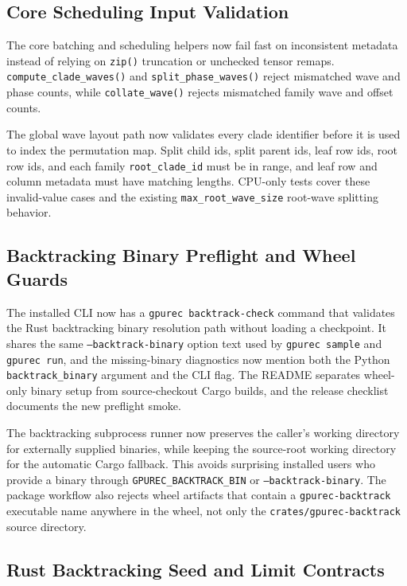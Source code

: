 \documentclass[11pt]{article}
\begin{document}
\subsection{Core Scheduling Input Validation}

The core batching and scheduling helpers now fail fast on inconsistent
metadata instead of relying on \texttt{zip()} truncation or unchecked tensor
remaps.  \texttt{compute\_clade\_waves()} and
\texttt{split\_phase\_waves()} reject mismatched wave and phase counts, while
\texttt{collate\_wave()} rejects mismatched family wave and offset counts.

The global wave layout path now validates every clade identifier before it is
used to index the permutation map.  Split child ids, split parent ids, leaf row
ids, root row ids, and each family \texttt{root\_clade\_id} must be in range,
and leaf row and column metadata must have matching lengths.  CPU-only tests
cover these invalid-value cases and the existing \texttt{max\_root\_wave\_size}
root-wave splitting behavior.

\subsection{Backtracking Binary Preflight and Wheel Guards}

The installed CLI now has a \texttt{gpurec backtrack-check} command that
validates the Rust backtracking binary resolution path without loading a
checkpoint.  It shares the same \texttt{--backtrack-binary} option text used by
\texttt{gpurec sample} and \texttt{gpurec run}, and the missing-binary
diagnostics now mention both the Python \texttt{backtrack\_binary} argument and
the CLI flag.  The README separates wheel-only binary setup from source-checkout
Cargo builds, and the release checklist documents the new preflight smoke.

The backtracking subprocess runner now preserves the caller's working directory
for externally supplied binaries, while keeping the source-root working
directory for the automatic Cargo fallback.  This avoids surprising installed
users who provide a binary through \texttt{GPUREC\_BACKTRACK\_BIN} or
\texttt{--backtrack-binary}.  The package workflow also rejects wheel artifacts
that contain a \texttt{gpurec-backtrack} executable name anywhere in the wheel,
not only the \texttt{crates/gpurec-backtrack} source directory.

\subsection{Rust Backtracking Seed and Limit Contracts}
\end{document}

